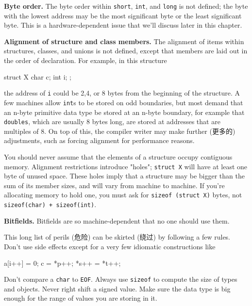 \textbf{Byte order.} The byte order within \verb'short', \verb'int', and
\verb'long' is not defined; the byte with the lowest address may be the
most significant byte or the least significant byte. This is a
hardware-dependent issue that we'll discuss later in this chapter.

\textbf{Alignment of structure and class members.} The alignment of items
within structures, classes, and unions is not defined, except that members
are laid out in the order of declaration. For example, in this structure
\begin{wellcode}
    struct X {
        char    c;
        int     i;
    };
\end{wellcode}
the address of \verb'i' could be 2,4, or 8 bytes from the beginning of the
structure. A few machines allow \verb'int's to be stored on odd boundaries,
but most demand that an n-byte primitive data type be stored at an n-byte
boundary, for example that \verb'doubles', which are usually 8 bytes long,
are stored at addresses that are multiples of 8.  On top of this, the
compiler writer may make further (更多的) adjustments, such as forcing
alignment for performance reasons.

You should never assume that the elements of a structure occupy contiguous
memory. Alignment restrictions introduce "holes"; \verb'struct X' will have
at least one byte of unused space. These holes imply that a structure may
be bigger than the sum of its member sizes, and will vary from machine to
machine. If you're allocating memory to hold one, you must ask for
\texttt{sizeof (struct X)} bytes, not \verb'sizeof(char) + sizeof(int)'.

\textbf{Bitfields.} Bitfields are so machine-dependent that no one should
use them.

This long list of perils (危险) can be skirted (绕过) by following a few
rules. Don't use side effects except for a very few idiomatic constructions
like
\begin{wellcode}
    a[i++] = 0;
    c = *p++;
    *s++ = *t++;
\end{wellcode}
Don't compare a \verb'char' to \verb'EOF'. Always use \verb'sizeof' to
compute the size of types and objects. Never right shift a signed value.
Make sure the data type is big enough for the range of values you are
storing in it.


